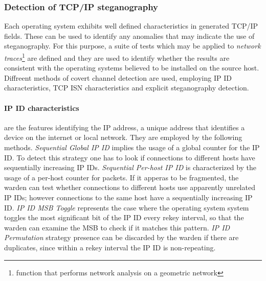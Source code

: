\documentclass[../../main.tex]{subfiles}
\begin{document}
    \subsubsection{Detection of TCP/IP steganography}

    Each operating system exhibits well defined characteristics in generated
    TCP/IP fields. These can be used to identify any anomalies that may indicate 
    the use of steganography. For this purpose, a suite of tests which may be
    applied to \emph{network traces}\footnote{function that performs network
    analysis on a geometric network} are defined and they are used to identify
    whether the results are consistent with the operating systems believed to be
    installed on the source host.
    Diffreent methods of covert channel detection are used, employing IP ID 
    characteristics, TCP ISN characteristics and explicit steganography
    detection.

    \paragraph{IP ID characteristics} are the features identifying the IP
    address, a unique address that identifies a device on the internet or local
    network. They are employed by the following methods.
    \emph{Sequential Global IP ID} implies the usage of a global counter for the
    IP ID. 
    To detect this strategy one has to look if connections to different hosts
    have sequentially increasing IP IDs.
    \emph{Sequential Per-host IP ID} is characterized by the usage of a per-host
    counter for packets. If it apperas to be fragmented, the warden can test
    whether connections to different hosts use apparently unrelated IP IDs;
    however connections to the same host have a sequentially increasing IP ID.
    \emph{IP ID MSB Toggle} represents the case where the operating system
    system toggles the most significant bit of the IP ID every rekey interval,
    so that the warden can examine the MSB to check if it matches this pattern.
    \emph{IP ID Permutation} strategy presence can be discarded by the warden if
    there are duplicates, since within a rekey interval the IP ID is
    non-repeating.
\end{document}
